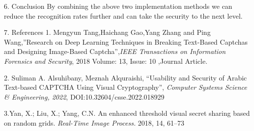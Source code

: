 \documentclass[
    landscape,      %
    paperwidth = 1120mm,
    paperheight = 950mm,
    fontscale = 0.30,
    margin = 1.7cm,
]{baposter}
\begin{document}
\begin{poster}
\begin{posterbox}[column=2,below=auto]{6. Conclusion}
By combining the above  two implementation methods we can reduce the recognition rates further and can take the security to the next level. 


\end{posterbox}


\begin{posterbox}[column=2, below=auto]{7. References}
1. Mengyun Tang,Haichang Gao,Yang Zhang and Ping Wang,”Research on Deep Learning Techniques in Breaking Text-Based Captchas and Designing Image-Based Captcha”,{\itshape IEEE Transactions on Information Forensics and Security}, 2018  Volume: 13, Issue: 10 ,Journal Article.

%
\hspace{0.1cm}

2. Suliman A. Alsuhibany, Meznah Alquraishi, “Usability and Security of Arabic Text-based CAPTCHA Using Visual Cryptography”, {\itshape Computer Systems Science \& Engineering, 2022}, DOI:10.32604/csse.2022.018929

%
\hspace{0.1cm}

3.Yan, X.; Liu, X.; Yang, C.N. An enhanced threshold visual secret sharing based on random grids. {\itshape Real-Time Image Process.} 2018, 14, 61–73

\end{posterbox}

\end{poster}
\end{document}
